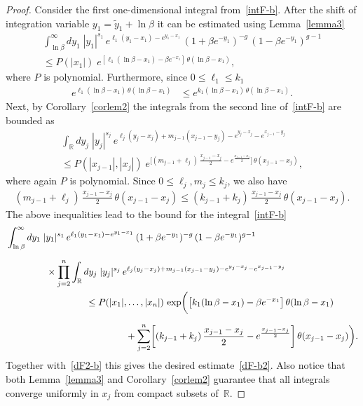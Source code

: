 \documentclass[11pt]{article}
\numberwithin{equation}{section}
\theoremstyle{plain}
\theoremstyle{definition}
\begin{document}
\begin{proof}
	Consider the first one-dimensional integral from~\eqref{intF-b}. After the shift of integration variable $y_1 = \tilde{y}_1 + \ln \beta$ it can be estimated using Lemma~\ref{lemma3}
	\begin{multline}
		\int_{\ln \beta}^\infty dy_1 \; |y_1|^{s_1} \, e^{\ell_{1} (y_1 - x_1) - e^{y_1 - x_1}} \, (1 + \beta e^{-y_1})^{- g} \, (1 - \beta e^{-y_1})^{g - 1} \\[3pt]
		\leq P(|x_1|) \; e^{[\ell_1 (\ln \beta - x_1) - \beta e^{-x_1}] \, \theta(\ln \beta - x_1)},
	\end{multline}
	where $P$ is polynomial. Furthermore, since $0 \leq \ell_1 \leq k_1$
	\begin{align}
		e^{ \ell_1 (\ln \beta - x_1) \, \theta(\ln \beta - x_1) } & \leq e^{ k_1 (\ln \beta - x_1) \, \theta(\ln \beta - x_1) }.
	\end{align}
	Next, by Corollary~\ref{corlem2} the integrals from the second line of~\eqref{intF-b} are bounded as
	\begin{multline}
		\int_{\mathbb{R}} dy_j \; |y_j|^{s_j} \,  e^{\ell_{j} (y_{j} - x_j) + m_{j-1} (x_{j - 1} - y_{j}) - e^{y_j - x_j} - e^{x_{j - 1} - y_{j}} } \\
		\leq P(|x_{j - 1}|, |x_j|) \; e^{ \bigl[ (m_{j - 1} + \ell_j) \, \frac{x_{j - 1} - x_j}{2} - e^{ \frac{x_{j - 1} - x_j }{2} } \bigr] \, \theta(x_{j - 1} - x_j)},
	\end{multline}
	where again $P$ is polynomial. Since $0 \leq \ell_j, m_j \leq k_j$, we also have
	\begin{align}
		(m_{j - 1} + \ell_j) \, \frac{x_{j - 1} - x_{j}}{2} \, \theta(x_{j - 1} - x_{j}) \leq (k_{j - 1} + k_{j}) \, \frac{x_{j - 1} - x_{j}}{2} \, \theta(x_{j - 1} - x_{j}).
	\end{align}
	The above inequalities lead to the bound for the integral~\eqref{intF-b} 
	\begin{align}
		\begin{aligned}
			& \int_{\ln \beta}^\infty dy_1 \; |y_1|^{s_1} \, e^{\ell_{1} (y_1 - x_1) - e^{y_1 - x_1}} \, (1 + \beta e^{-y_1})^{- g} \, (1 - \beta e^{-y_1})^{g - 1} \\[6pt]
			& \hspace{1.5cm} \times \prod_{j = 2}^{n} \int_{\mathbb{R}} dy_j \; |y_j|^{s_j} \,  e^{\ell_{j} (y_{j} - x_j) + m_{j-1} (x_{j - 1} - y_{j}) - e^{y_j - x_j} - e^{x_{j - 1} - y_{j}} } \\
			& \hspace{3cm} \leq P(|x_1|, \dots, |x_n|) \, \exp \biggl( \bigl[k_1 (\ln \beta - x_1) - \beta e^{-x_1} \bigr]\, \theta(\ln \beta - x_1) \\[6pt]
			& \hspace{4.5cm} + \sum_{j = 2}^{n} \biggl[ (k_{j - 1} + k_j) \, \frac{x_{j - 1} - x_j}{2} - e^{ \frac{x_{j - 1} - x_j }{2} } \biggr] \, \theta(x_{j - 1} - x_j) \biggr).
		\end{aligned}
	\end{align}
	Together with~\eqref{dF2-b} this gives the desired estimate~\eqref{dF-b2}. Also notice that both Lemma~\ref{lemma3} and Corollary~\ref{corlem2} guarantee that all integrals converge uniformly in $x_j$ from compact subsets of~$\mathbb{R}$.
	

\end{proof}
\end{document}
